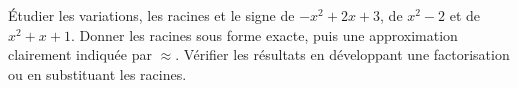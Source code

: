 \begin{activity}
Étudier les variations, les racines et le signe de $-x^2+2x+3$, de $x^2-2$ et de $x^2+x+1$. Donner les racines sous forme exacte, puis une approximation clairement indiquée par $\approx$. Vérifier les résultats en développant une factorisation ou en substituant les racines.
\end{activity}

